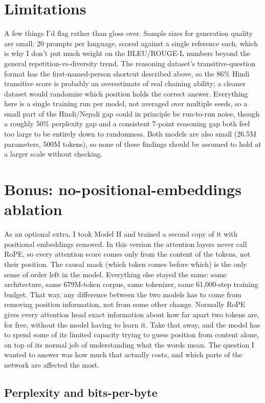 \documentclass[10pt]{article}
\begin{document}
\section{Limitations}

A few things I'd flag rather than gloss over. Sample sizes for generation quality are small: 20 prompts per language, scored against a single reference each, which is why I don't put much weight on the BLEU/ROUGE-L numbers beyond the general repetition-vs-diversity trend. The reasoning dataset's transitive-question format has the first-named-person shortcut described above, so the 86\% Hindi transitive score is probably an overestimate of real chaining ability; a cleaner dataset would randomize which position holds the correct answer. Everything here is a single training run per model, not averaged over multiple seeds, so a small part of the Hindi/Nepali gap could in principle be run-to-run noise, though a roughly 50\% perplexity gap and a consistent 7-point reasoning gap both feel too large to be entirely down to randomness. Both models are also small (26.5M parameters, 500M tokens), so none of these findings should be assumed to hold at a larger scale without checking.

\section{Bonus: no-positional-embeddings ablation}

As an optional extra, I took Model H and trained a second copy of it with positional embeddings removed. In this version the attention layers never call RoPE, so every attention score comes only from the content of the tokens, not their position. The causal mask (which token comes before which) is the only sense of order left in the model. Everything else stayed the same: same architecture, same 679M-token corpus, same tokenizer, same 61,000-step training budget. That way, any difference between the two models has to come from removing position information, not from some other change. Normally RoPE gives every attention head exact information about how far apart two tokens are, for free, without the model having to learn it. Take that away, and the model has to spend some of its limited capacity trying to guess position from content alone, on top of its normal job of understanding what the words mean. The question I wanted to answer was how much that actually costs, and which parts of the network are affected the most.

\subsection{Perplexity and bits-per-byte}
\end{document}
